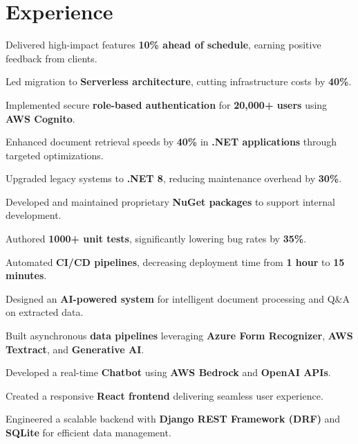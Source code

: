 \documentclass[]{deedy-resume-reversed}
\begin{document}
\begin{minipage}[t]{0.60\textwidth}

\section{Experience}

\vspace{\topsep}
\begin{tightemize}
\item Delivered high-impact features \textbf{10\% ahead of schedule}, earning positive feedback from clients.
\item Led migration to \textbf{Serverless architecture}, cutting infrastructure costs by \textbf{40\%}.
\item Implemented secure \textbf{role-based authentication} for \textbf{20,000+ users} using \textbf{AWS Cognito}.
\item Enhanced document retrieval speeds by \textbf{40\%} in \textbf{.NET applications} through targeted optimizations.
\item Upgraded legacy systems to \textbf{.NET 8}, reducing maintenance overhead by \textbf{30\%}.
\item Developed and maintained proprietary \textbf{NuGet packages} to support internal development.
\item Authored \textbf{1000+ unit tests}, significantly lowering bug rates by \textbf{35\%}.
\item Automated \textbf{CI/CD pipelines}, decreasing deployment time from \textbf{1 hour} to \textbf{15 minutes}.
\end{tightemize}

\sectionsep

\begin{tightemize}
\item Designed an \textbf{AI-powered system} for intelligent document processing and Q\&A on extracted data.
\item Built asynchronous \textbf{data pipelines} leveraging \textbf{Azure Form Recognizer}, \textbf{AWS Textract}, and \textbf{Generative AI}.
\item Developed a real-time \textbf{Chatbot} using \textbf{AWS Bedrock} and \textbf{OpenAI APIs}.
\item Created a responsive \textbf{React frontend} delivering seamless user experience.
\item Engineered a scalable backend with \textbf{Django REST Framework (DRF)} and \textbf{SQLite} for efficient data management.
\end{tightemize}
\sectionsep


\end{minipage}
\end{document}
